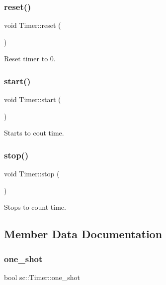 \subsubsection{\texorpdfstring{reset()}{reset()}}
{\footnotesize\ttfamily void Timer\+::reset (\begin{DoxyParamCaption}{ }\end{DoxyParamCaption})}



Reset timer to 0. 

\mbox{\label{classsc_1_1_timer_a3a8b5272198d029779dc9302a54305a8}} 
\subsubsection{\texorpdfstring{start()}{start()}}
{\footnotesize\ttfamily void Timer\+::start (\begin{DoxyParamCaption}{ }\end{DoxyParamCaption})}



Starts to cout time. 

\mbox{\label{classsc_1_1_timer_a63f0eb44b27402196590a03781515dba}} 
\subsubsection{\texorpdfstring{stop()}{stop()}}
{\footnotesize\ttfamily void Timer\+::stop (\begin{DoxyParamCaption}{ }\end{DoxyParamCaption})}



Stops to count time. 



\subsection{Member Data Documentation}
\mbox{\label{classsc_1_1_timer_a2c23836479c69ea219f506a7ad8e83f5}} 
\subsubsection{\texorpdfstring{one\_shot}{one\_shot}}
{\footnotesize\ttfamily bool sc\+::\+Timer\+::one\+\_\+shot}

